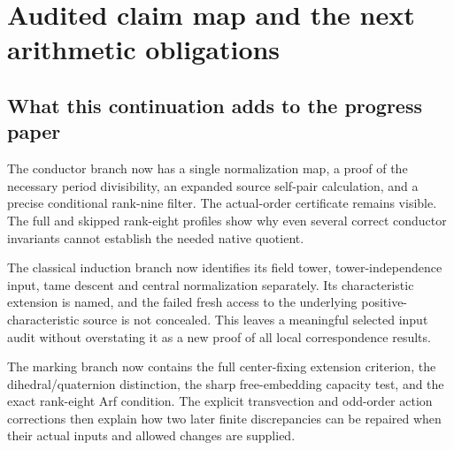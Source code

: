 \section{Audited claim map and the next arithmetic obligations}\label{sec:register}
\subsection{What this continuation adds to the progress paper}
The conductor branch now has a single normalization map, a proof of the necessary period divisibility, an expanded source self-pair calculation, and a precise conditional rank-nine filter. The actual-order certificate remains visible. The full and skipped rank-eight profiles show why even several correct conductor invariants cannot establish the needed native quotient.

The classical induction branch now identifies its field tower, tower-independence input, tame descent and central normalization separately. Its characteristic extension is named, and the failed fresh access to the underlying positive-characteristic source is not concealed. This leaves a meaningful selected input audit without overstating it as a new proof of all local correspondence results.

The marking branch now contains the full center-fixing extension criterion, the dihedral/quaternion distinction, the sharp free-embedding capacity test, and the exact rank-eight Arf condition. The explicit transvection and odd-order action corrections then explain how two later finite discrepancies can be repaired when their actual inputs and allowed changes are supplied.

